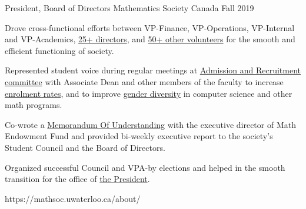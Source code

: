 
\begin{cventries}
\cventrylinker
{President, Board of Directors}
{Mathematics Society}
{Canada}
{Fall 2019}
{ %
\begin{cvitems}
\item{Drove cross-functional efforts between VP-Finance, VP-Operations, VP-Internal and  VP-Academics, \underline{25+ directors}, and \underline{50+ other volunteers} for the smooth and efficient functioning of society.}
\item{Represented student voice during regular meetings at \underline{Admission and Recruitment committee} with Associate Dean and other members of the faculty to increase \underline{enrolment rates}, and to improve \underline{gender diversity} in computer science and other math programs.}
\item{Co-wrote a \underline{Memorandum Of Understanding} with the executive director of Math Endowment Fund and provided bi-weekly executive report to the society's Student Council and the Board of Directors.}
\item{Organized successful Council and VPA-by elections and helped in the smooth transition for the office of \underline{the President}.}
\end{cvitems}
}
{https://mathsoc.uwaterloo.ca/about/}

 \end{cventries}